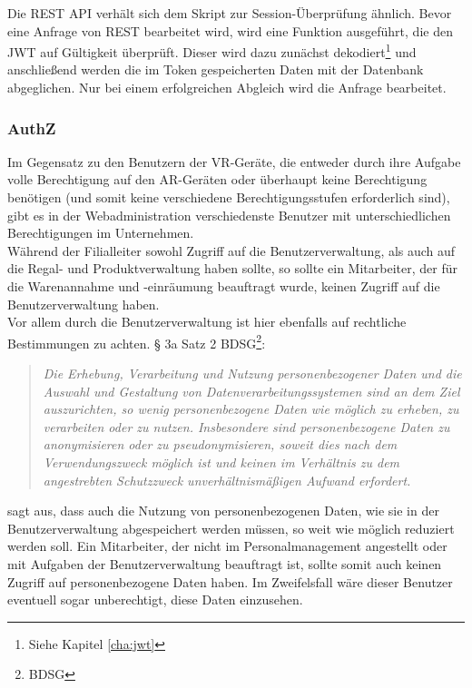 Die \acs{REST} \acs{API} verhält sich dem Skript zur Session-Überprüfung ähnlich. Bevor eine Anfrage von \acs{REST} bearbeitet wird, wird eine Funktion ausgeführt, die den \acs{JWT} auf Gültigkeit überprüft. Dieser wird dazu zunächst dekodiert\footnote{Siehe Kapitel \ref{cha:jwt} } und anschließend werden die im Token gespeicherten Daten mit der Datenbank abgeglichen. Nur bei einem erfolgreichen Abgleich wird die Anfrage bearbeitet.

\subsubsection{\acf{AuthZ}}
Im Gegensatz zu den Benutzern der \ac{VR}-Geräte, die entweder durch ihre Aufgabe volle Berechtigung auf den \ac{AR}-Geräten oder überhaupt keine Berechtigung benötigen (und somit keine verschiedene Berechtigungsstufen erforderlich sind), gibt es in der Webadministration verschiedenste Benutzer mit unterschiedlichen Berechtigungen im Unternehmen.\\
Während der Filialleiter sowohl Zugriff auf die Benutzerverwaltung, als auch auf die Regal- und Produktverwaltung haben sollte, so sollte ein Mitarbeiter, der für die Warenannahme und -einräumung beauftragt wurde, keinen Zugriff auf die Benutzerverwaltung haben.\\
Vor allem durch die Benutzerverwaltung ist hier ebenfalls auf rechtliche Bestimmungen zu achten. § 3a Satz 2 \acs{BDSG}\footnote{\acf{BDSG}}:
\begin{quote}
	\glqq \textit{Die Erhebung, Verarbeitung und Nutzung personenbezogener Daten und die Auswahl und Gestaltung von Datenverarbeitungssystemen sind an dem Ziel auszurichten, so wenig personenbezogene Daten wie möglich zu erheben, zu verarbeiten oder zu nutzen. Insbesondere sind personenbezogene Daten zu anonymisieren oder zu pseudonymisieren, soweit dies nach dem Verwendungszweck möglich ist und keinen im Verhältnis zu dem angestrebten Schutzzweck unverhältnismäßigen Aufwand erfordert.}\grqq
\end{quote}
sagt aus, dass auch die Nutzung von personenbezogenen Daten, wie sie in der Benutzerverwaltung abgespeichert werden müssen, so weit wie möglich reduziert werden soll. Ein Mitarbeiter, der nicht im Personalmanagement angestellt oder mit Aufgaben der Benutzerverwaltung beauftragt ist, sollte somit auch keinen Zugriff auf personenbezogene Daten haben. Im Zweifelsfall wäre dieser Benutzer eventuell sogar unberechtigt, diese Daten einzusehen.\\

